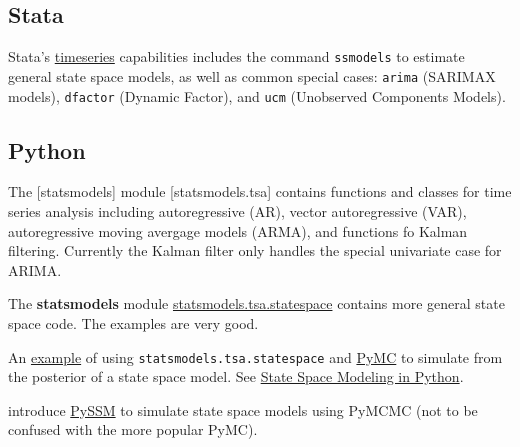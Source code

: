 \documentclass[]{book}
\begin{document}
\subsection{Stata}\label{stata}

Stata's \href{http://www.stata.com/manuals14/ts.pdf}{timeseries}
capabilities includes the command \texttt{ssmodels} to estimate general
state space models, as well as common special cases: \texttt{arima}
(SARIMAX models), \texttt{dfactor} (Dynamic Factor), and \texttt{ucm}
(Unobserved Components Models).

\subsection{Python}\label{python}

The {[}statsmodels{]} module {[}statsmodels.tsa{]} contains functions
and classes for time series analysis including autoregressive (AR),
vector autoregressive (VAR), autoregressive moving avergage models
(ARMA), and functions fo Kalman filtering. Currently the Kalman filter
only handles the special univariate case for ARIMA.

The \textbf{statsmodels} module
\href{http://www.statsmodels.org/dev/statespace.html\#}{statsmodels.tsa.statespace}
contains more general state space code. The examples are very good.

An
\href{http://pages.uoregon.edu/cfulton/posts/state_space_mh.html}{example}
of using \texttt{statsmodels.tsa.statespace} and
\href{http://pymcmc.readthedocs.io/en/latest/}{PyMC} to simulate from
the posterior of a state space model. See
\href{http://pages.uoregon.edu/cfulton/posts/state_space_python.html}{State
Space Modeling in Python}.

\textcite{StricklandBurdettMengersenEtAl2014a} introduce
\href{https://bitbucket.org/christophermarkstrickland/pyssm}{PySSM} to
simulate state space models using PyMCMC (not to be confused with the
more popular PyMC).

\printbibliography
\end{document}

